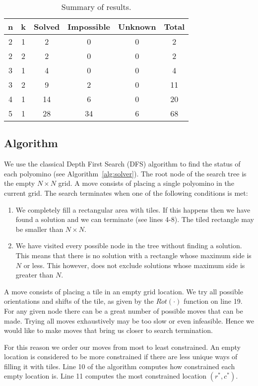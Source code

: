 \documentclass[10pt,a4paper]{article}
\theoremstyle{definition}
\begin{document}
\begin{table}[!htpb]
\centering
\begin{tabular}{|c|c|c|c|c|c|}
\hline
n & k & Solved & Impossible & Unknown & Total \\ \hline
2 & 1 & 2 & 0 & 0 & 2 \\ \hline
2 & 2 & 2 & 0 & 0 & 2 \\ \hline
3 & 1 & 4 & 0 & 0 & 4 \\ \hline
3 & 2 & 9 & 2 & 0 & 11 \\ \hline
4 & 1 & 14 & 6 & 0 & 20 \\ \hline
5 & 1 & 28 & 34 & 6 & 68 \\ \hline
\end{tabular}
\caption{Summary of results.}
\label{tab:summary}
\end{table}


\subsection{Algorithm}

We use the classical Depth First Search (DFS) algorithm to find the status of each polyomino (see Algorithm~\ref{alg:solver}).
The root node of the search tree is the empty $N \times N$ grid. A move consists of placing a single polyomino in the current
grid. The search terminates when one of the following conditions is met:
\begin{enumerate}
\item We completely fill a rectangular area with tiles. 
If this happens then we have found a solution and we can terminate (see lines 4-8).
The tiled rectangle may be smaller than $N \times N$.
\item We have visited every possible node in the tree without finding a solution.
This means that there is no solution with a rectangle
whose maximum side is $N$ or less. This however, does not exclude solutions whose maximum side is greater than $N$.
\end{enumerate}

A move consists of placing a tile in an empty grid location. We try all possible orientations and shifts
of the tile, as given by the $Rot(\cdot)$ function on line 19.
For any given node there can be a great number of possible moves that can be made. 
Trying all moves exhaustively may be too slow or even infeasible.
Hence we would like to make moves that bring us closer to search termination. 

For this reason we order our moves from most to least constrained. An empty location is considered to be more constrained if there are
less unique ways of filling it with tiles. Line 10 of the algorithm computes how constrained each empty location is. 
Line 11 computes the most constrained location $(r^*,c^*)$.
\end{document}
